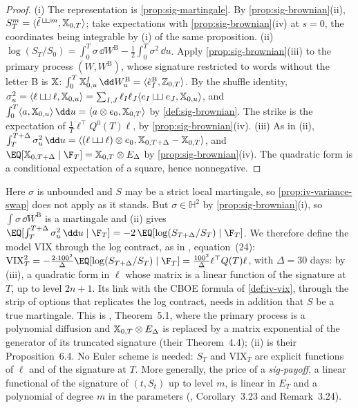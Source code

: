 \begin{proof}
(i) The representation is \cref{prop:sig-martingale}. By \cref{prop:sig-brownian}(ii),
$S_T^m=\langle\tilde\ell^{\,\mathbin{\sqcup\mkern-3mu\sqcup} m},\mathbb X_{0,T}\rangle$; take expectations with \cref{prop:sig-brownian}(iv) at $s=0$,
the coordinates being integrable by (i) of the same proposition.
(ii) $\log(S_T/S_0)=\int_0^T\sigma\,\dd W^{\mathrm B}-\frac12\int_0^T\sigma^2\,\dd u$. Apply \cref{prop:sig-brownian}(iii)
to the primary process $(W,W^{\mathrm B})$, whose signature restricted to words without the letter B is $\mathbb X$:
$\int_0^T\sigX^I_{0,u}\,\dd W^{\mathrm B}_u=\langle\tilde e^{\mathrm B}_I,\sigZ_{0,T}\rangle$. By the shuffle identity,
$\sigma_u^2=\langle\ell\mathbin{\sqcup\mkern-3mu\sqcup}\ell,\mathbb X_{0,u}\rangle=\sum_{I,J}\ell_I\ell_J\langle e_I\mathbin{\sqcup\mkern-3mu\sqcup} e_J,\mathbb X_{0,u}\rangle$, and
$\int_0^T\langle a,\sigX_{0,u}\rangle\,\dd u=\langle a\otimes e_0,\sigX_{0,T}\rangle$ by \cref{def:sig-brownian}. The strike is
the expectation of $\frac1T\ell^\top Q^0(T)\ell$, by \cref{prop:sig-brownian}(iv).
(iii) As in (ii), $\int_T^{T+\Delta}\sigma_u^2\,\dd u=\langle(\ell\sigsh\ell)\otimes e_0,\sigX_{0,T+\Delta}-\sigX_{0,T}\rangle$, and
$\EQ[\sigX_{0,T+\Delta}\mid\F_T]=\sigX_{0,T}\otimes E_\Delta$ by \cref{prop:sig-brownian}(iv). The quadratic form is a
conditional expectation of a square, hence nonnegative.
\end{proof}

Here $\sigma$ is unbounded and $S$ may be a strict local martingale, so \cref{prop:iv-variance-swap} does not apply
as it stands. But $\sigma\in\mathbb H^2$ by \cref{prop:sig-brownian}(i), so $\int\sigma\,\dd W^{\mathrm B}$ is a martingale and
(ii) gives $\EQ[\int_T^{T+\Delta}\sigma_u^2\,\dd u\mid\F_T]=-2\,\EQ[\log(S_{T+\Delta}/S_T)\mid\F_T]$. We therefore define the model
VIX through the log contract, as in \textcite{cuchiero-gazzani-moller-svaluto-ferro-2026}, equation~(24):
$\mathrm{VIX}_T^2=-\frac{2\cdot100^2}{\Delta}\EQ[\log(S_{T+\Delta}/S_T)\mid\F_T]=\frac{100^2}{\Delta}\ell^\top Q(T)\ell$, with $\Delta=30$ days:
by (iii), a quadratic form in $\ell$ whose matrix is a linear function of the signature at $T$, up to level $2n+1$.
Its link with the CBOE formula of \cref{def:iv-vix}, through the strip of options that replicates the log contract,
needs in addition that $S$ be a true martingale. This is
\textcite{cuchiero-gazzani-moller-svaluto-ferro-2025}, Theorem~5.1, where the primary process is a polynomial
diffusion and $\mathbb X_{0,T}\otimes E_\Delta$ is replaced by a matrix exponential of the generator of its truncated
signature (their Theorem~4.4); (ii) is their Proposition~6.4. No Euler scheme is needed: $S_T$ and $\mathrm{VIX}_T$
are explicit functions of $\ell$ and of the signature at $T$. More generally, the price of a \emph{sig-payoff}, a
linear functional of the signature of $(t,S_t)$ up to level $m$, is linear in $E_T$ and a polynomial of degree $m$
in the parameters (\textcite{cuchiero-gazzani-svaluto-ferro-2023}, Corollary~3.23 and Remark~3.24).

